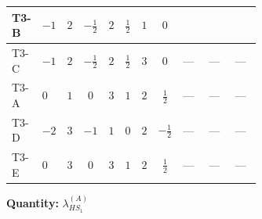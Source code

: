 \documentclass[8pt]{article}
\begin{document}
\begin{landscape}
\begin{longtable}{@{}llcccccc >{\raggedright\arraybackslash}p{0.21\linewidth} >{\raggedright\arraybackslash}p{0.21\linewidth} >{\raggedright\arraybackslash}p{0.21\linewidth}@{}}
T3-B & $-1$ & $2$ & $-\frac{1}{2}$ & $2$ & $\frac{1}{2}$ & $1$ & $0$ & \scriptsize\adjustbox{max width=\linewidth}{$\begin{gathered} {\lambda_{HS_1}^{(A)}} (2 T_{\nu}^{(1)}+6 \operatorname{Tr}\!\left({Y_d}\,\left({Y_d}\right)^{\dagger}\right)+2 \operatorname{Tr}\!\left({Y_e}\,\left({Y_e}\right)^{\dagger}\right)+6 \operatorname{Tr}\!\left({Y_u}\,\left({Y_u}\right)^{\dagger}\right))\end{gathered}$} & \scriptsize\adjustbox{max width=\linewidth}{$\begin{gathered} +{\lambda_{H H^\dagger S_1^\dagger S_2^\dagger}^{\rm Cross}} \left(-\frac{2}{3} \operatorname{Tr}\!\left({y_1}\,\left({y_2}\right)^{\dagger}\right)-\frac{4}{3} (2 \left({\lambda_{H H^\dagger S_1^\dagger S_2^\dagger}^{\rm Cross}}\right)^{*}+\left({\lambda_{11}}\right)^{*})\right)\end{gathered}$} & \scriptsize\adjustbox{max width=\linewidth}{$\begin{gathered} -\frac{2}{3} \left({\lambda_{H H^\dagger S_1^\dagger S_2^\dagger}^{\rm Cross}}\right)^{*} \operatorname{Tr}\!\left({y_2}\,\left({y_1}\right)^{\dagger}\right)\end{gathered}$} \\
\midrule
T3-C & $-1$ & $2$ & $-\frac{1}{2}$ & $2$ & $\frac{1}{2}$ & $3$ & $0$ & --- & --- & --- \\
\midrule
T3-A & $0$ & $1$ & $0$ & $3$ & $1$ & $2$ & $\frac{1}{2}$ & --- & --- & --- \\
\midrule
T3-D & $-2$ & $3$ & $-1$ & $1$ & $0$ & $2$ & $-\frac{1}{2}$ & --- & --- & --- \\
\midrule
T3-E & $0$ & $3$ & $0$ & $3$ & $1$ & $2$ & $\frac{1}{2}$ & --- & --- & --- \\
\midrule
\bottomrule
\end{longtable}
\clearpage
\noindent\textbf{Quantity: }$\lambda_{HS_1}^{(A)}$\par\smallskip

\end{landscape}
\end{document}
